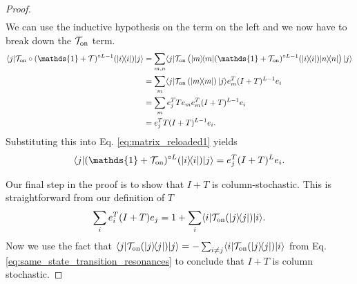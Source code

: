 \documentclass{article}
\newcommand{\on}{\rm on}
\newcommand{\ket}[1]{|#1\rangle}
\newcommand{\bra}[1]{\langle #1|}
\newcommand{\ketbra}[2]{| #1\rangle\! \langle #2|}
\newcommand{\brackets}[1]{\left[ #1 \right]}
\newcommand{\TT}{\mathcal{T}}
\DeclareMathOperator{\Tr}{Tr}
\newcommand{\trace}[1]{\Tr \brackets{ #1 }}
\newcommand{\identity}{\mathds{1}}
\begin{document}
\begin{proof}
\begin{align}
\end{align}
We can use the inductive hypothesis on the term on the left and we now have to break down the $\mathcal{T}_{\on}$ term. 
\begin{align}
    \bra{j} \mathcal{T}_{\on} \circ (\identity + \mathcal{T})^{\circ L - 1} (\ketbra{i}{i}) \ket{j} &= \sum_{m, n} \bra{j} \mathcal{T}_{\on}\left( \ketbra{m}{m} (\identity + \mathcal{T}_{\on})^{\circ L - 1} (\ketbra{i}{i}) \ketbra{n}{n} \right) \ket{j} \\
    &= \sum_{m} \bra{j} \mathcal{T}_{\on} \left( \ketbra{m}{m} \right) \ket{j} e_m^T (I + T)^{L - 1} e_i \\
    &= \sum_m e_j^T T e_m e_m^T (I + T)^{L -1} e_i \\
    &= e_j^T T(I + T)^{L-1} e_i.
\end{align}
Substituting this into Eq. \eqref{eq:matrix_reloaded1} yields \begin{equation}
     \bra{j} (\identity + \mathcal{T}_{\on})^{\circ L}(\ketbra{i}{i}) \ket{j} = e_j^T (I + T)^{L} e_i.
\end{equation} 

Our final step in the proof is to show that $I + T$ is column-stochastic. This is straightforward from our definition of $T$
\begin{equation}
    \sum_i e_i^T (I + T) e_j = 1 + \sum_i \bra{i} \mathcal{T}_{\on}(\ketbra{j}{j}) \ket{i}.
\end{equation}
Now we use the fact that $\bra{j} \TT_{\on}(\ketbra{j}{j}) \ket{j} = - \sum_{i \neq j} \bra{i} \TT_{\on}(\ketbra{j}{j}) \ket{i}$ from Eq. \eqref{eq:same_state_transition_resonances} to conclude that $I + T$ is column stochastic.
\end{proof}
\end{document}
